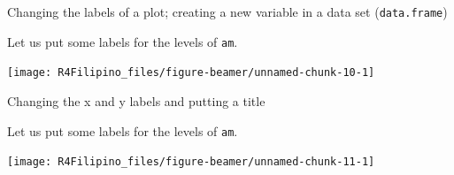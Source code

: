 \begin{frame}[fragile]{Changing the labels of a plot; creating a new
variable in a data set (\texttt{data.frame})}

Let us put some labels for the levels of \texttt{am}.

\begin{Shaded}
\begin{Highlighting}[]
\OperatorTok{$}\StringTok{ }\OperatorTok{$} \NormalTok{(}\NormalTok{,}\NormalTok{), } \NormalTok{(}\NormalTok{, }\NormalTok{))}
\OperatorTok{~}
\end{Highlighting}
\end{Shaded}

\begin{center}\texttt{[image: R4Filipino\_files/figure-beamer/unnamed-chunk-10-1]} \end{center}

\end{frame}

\begin{frame}[fragile]{Changing the x and y labels and putting a title}

Let us put some labels for the levels of \texttt{am}.

\begin{Shaded}
\begin{Highlighting}[]
\OperatorTok{~}
         \NormalTok{,}
         \NormalTok{,}
         \NormalTok{)}
\end{Highlighting}
\end{Shaded}

\begin{center}\texttt{[image: R4Filipino\_files/figure-beamer/unnamed-chunk-11-1]} \end{center}

\end{frame}

